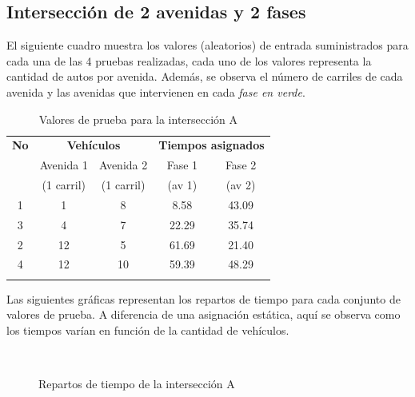 \newpage
\subsection{Intersección de 2 avenidas y 2 fases}
El siguiente cuadro muestra los valores (aleatorios) de entrada suministrados para cada una de las 4 pruebas realizadas, cada uno de los valores representa la cantidad de autos por avenida. Además, se observa el número de carriles de cada avenida y las avenidas que intervienen en cada \emph{fase en verde}.

\begin{longtable}[c]{ccccc} \toprule
	\textbf{No} &\multicolumn{2}{c}{\textbf{Vehículos}} & \multicolumn{2}{c}{\textbf{Tiempos asignados}} \\[0.2cm]
	&  Avenida 1 & Avenida 2 & Fase 1 & Fase 2 \\[0cm]
	&{\scriptsize(1 carril)}&{\scriptsize (1 carril)} &{\scriptsize (av 1)} &{\scriptsize(av 2)} \\[0.1cm]\midrule
	1 & 1 & 8 & 8.58 &43.09\\
	3 & 4 & 7 & 22.29 & 35.74\\
	2 & 12 & 5 & 61.69 & 21.40\\
	4 & 12 & 10 & 59.39 & 48.29\\\bottomrule
	\caption{Valores de prueba para la intersección A}
\end{longtable}

Las siguientes gráficas representan los repartos de tiempo para cada conjunto de valores de prueba. A diferencia de una asignación estática, aquí se observa como los tiempos varían en función de la cantidad de vehículos.

\begin{figure}[H]
	\centering
	\\
	\caption{Repartos de tiempo de la intersección A}
\end{figure}





